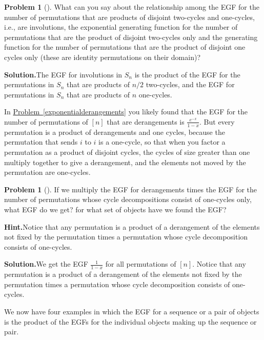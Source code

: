\documentclass[10pt,]{book}
\theoremstyle{plain}
\theoremstyle{definition}
\newtheorem{activity}[project]{Problem}
\theoremstyle{definition}
\numberwithin{equation}{chapter}
\begin{document}
\begin{activity}[]\label{x2cyclesand1cycles}
What can you say about the relationship among the EGF for the number of permutations that are products of disjoint two-cycles and one-cycles, i.e., are involutions, the exponential generating function for the number of permutations that are the product of disjoint two-cycles only and the generating function for the number of permutations that are the product of disjoint one cycles only (these are identity permutations on their domain)?%
\par\medskip\noindent%
\textbf{Solution.}\quad The EGF for involutions in \(S_n\) is the product of the EGF for the permutations in \(S_n\) that are products of \(n/2\) two-cycles, and the EGF for permutations in \(S_n\) that are products of \(n\) one-cycles.%
\end{activity}
In \hyperref[exponentialderangements]{Problem~\ref{exponentialderangements}} you likely found that the EGF for the number of permutations of \([n]\) that are derangements is \(\frac{e^{-x}}{1-x}\). But every permutation is a product of derangements and one cycles, because the permutation that sends \(i\) to \(i\) is a one-cycle, so that when you factor a permutation as a product of disjoint cycles, the cycles of size greater than one multiply together to give a derangement, and the elements not moved by the permutation are one-cycles.%
\begin{activity}[]\label{derangementsand1cycles}
If we multiply the EGF for derangements times the EGF for the number of permutations whose cycle decompositions consist of one-cycles only, what EGF do we get? for what set of objects have we found the EGF?%
\par\medskip\noindent%
\textbf{Hint.}\quad Notice that any permutation is a product of a derangement of the elements not fixed by the permutation times a permutation whose cycle decomposition consists of one-cycles.%
\par\medskip\noindent%
\textbf{Solution.}\quad We get the EGF \(\frac{1}{1-x}\) for all permutations of \([n]\). Notice that any permutation is a product of a derangement of the elements not fixed by the permutation times a permutation whose cycle decomposition consists of one-cycles.%
\end{activity}
We now have four examples in which the EGF for a sequence or a pair of objects is the product of the EGFs for the individual objects making up the sequence or pair.%
\end{document}
